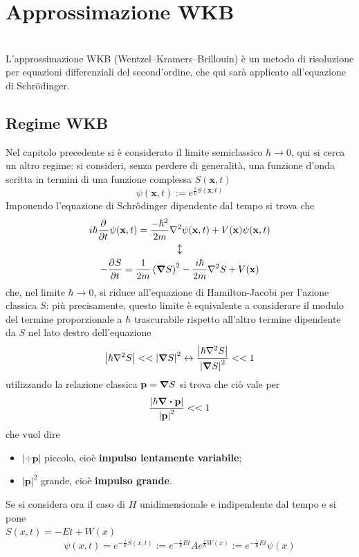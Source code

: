 \chapter{Approssimazione WKB}\\

L'approssimazione WKB (Wentzel–Kramers–Brillouin) è un metodo di risoluzione per equazioni
differenziali del second'ordine, che qui sarà applicato all'equazione di Schrödinger.
\section{Regime WKB}
Nel capitolo precedente si è considerato il limite semiclassico $\hbar\to0$, qui si cerca un altro
regime: si consideri, senza perdere di generalità, una funzione d'onda scritta in termini di una
funzione complessa $S(\mathbf{x},t)$
$$\psi(\mathbf{x},t) := e^{\frac{i}{\hbar}S(\mathbf{x},t)}$$
Imponendo l'equazione di Schrödinger dipendente dal tempo si trova che
\begin{gather*}
i\hbar\pdv[]{}{t}\psi(\mathbf{x},t) = \frac{-\hbar^2}{2m}\laplacian \psi(\mathbf{x},t) +
V(\mathbf{x})\psi(\mathbf{x},t)\\ \updownarrow \\
-\pdv[]{S}{t} = \frac{1}{2m}\left(\gradient S\right)^2-\frac{i\hbar}{2m}\laplacian S+V(\mathbf{x})
\end{gather*}
che, nel limite $\hbar\to0$, si riduce all'equazione di Hamilton-Jacobi per l'azione classica $S$:
più precisamente, questo limite è equivalente a considerare il modulo del termine proporzionale a
$\hbar$ trascurabile rispetto all'altro termine dipendente da $S$ nel lato destro dell'equazione
$$\left|\hbar\laplacian S\right|<<\left|\gradient S\right|^2\leftrightarrow\frac{\left|\hbar\laplacian 
S\right|}{\left|\gradient S\right|^2}<<1$$
utilizzando la relazione classica $\mathbf{p} = \gradient S$ si trova che ciò vale per
$$\frac{\left|\hbar\divergence \mathbf{p}\right|}{\left|\mathbf{p}\right|^2}<<1$$
che vuol dire
\begin{itemize}
    \item $\left|\div \mathbf{p}\right|$ piccolo, cioè \textbf{impulso lentamente variabile};
    \item $\left|\mathbf{p}\right|^2$ grande, cioè \textbf{impulso grande}.
\end{itemize}
Se si considera ora il caso di $H$ unidimensionale e indipendente dal tempo e si pone\\
$S(x,t) = -Et+W(x)$
$$\psi(x,t) = e^{-\frac{i}{\hbar}S(x,t)} :=e^{-\frac{i}{\hbar}Et}
Ae^{\frac{i}{\hbar}W(x)}:=e^{-\frac{i}{\hbar}Et}\psi(x)$$
